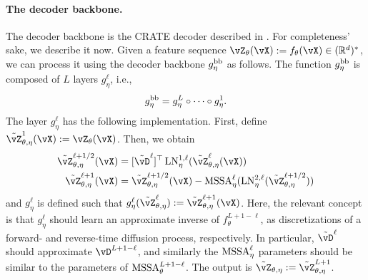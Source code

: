 \documentclass[\toplevelprefix/book-main.tex]{subfiles}
\begin{document}
\paragraph{The decoder backbone.} The decoder backbone is the CRATE decoder described in . For completeness' sake, we describe it now. Given a feature sequence \(\vZ_{\theta}(\vX) := f_{\theta}(\vX) \in (\R^{d})^{*}\), we can process it using the decoder backbone \(g_{\eta}^{\mathrm{bb}}\) as follows. The function \(g_{\eta}^{\mathrm{bb}}\) is composed of \(L\) layers \(g_{\eta}^{\ell}\), i.e.,
\begin{equation}
    g_{\eta}^{\mathrm{bb}} = g_{\eta}^{L} \circ \cdots \circ g_{\eta}^{1}.
\end{equation}
The layer \(g_{\eta}^{\ell}\) has the following implementation. First, define \(\tilde{\vZ}_{\theta, \eta}^{1}(\vX) := \vZ_{\theta}(\vX)\). Then, we obtain
\begin{align}
    \tilde{\vZ}_{\theta, \eta}^{\ell + 1/2}(\vX) 
    &= [\tilde{\vD}^{\ell}]^{\top}\LN_{\eta}^{1, \ell}(\tilde{\vZ}_{\theta, \eta}^{\ell}(\vX)) \\ 
    \tilde{\vZ}_{\theta, \eta}^{\ell + 1}(\vX)
    &= \tilde{\vZ}_{\theta, \eta}^{\ell + 1/2}(\vX) - \MSSA_{\eta}^{\ell}(\LN_{\eta}^{2, \ell}(\tilde{\vZ}_{\theta, \eta}^{\ell + 1/2}))
\end{align}
and \(g_{\eta}^{\ell}\) is defined such that \(g_{\eta}^{\ell}(\tilde{\vZ}_{\theta, \eta}^{\ell}) := \tilde{\vZ}_{\theta, \eta}^{\ell + 1}(\vX)\). Here, the relevant concept is that \(g_{\eta}^{\ell}\) should learn an approximate inverse of \(f_{\theta}^{L + 1 - \ell}\), as discretizations of a forward- and reverse-time diffusion process, respectively. In particular, \(\tilde{\vD}^{\ell}\) should approximate \(\vD^{L + 1 - \ell}\), and similarly the \(\operatorname{MSSA}_{\eta}^{\ell}\) parameters should be similar to the parameters of \(\operatorname{MSSA}_{\theta}^{L + 1 - \ell}\). The output is \(\tilde{\vZ}_{\theta, \eta} := \tilde{\vZ}_{\theta, \eta}^{L + 1}\).
\end{document}
